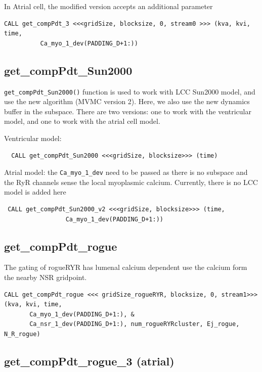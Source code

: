 In Atrial cell, the modified version accepts an additional parameter
\begin{verbatim}
CALL get_compPdt_3 <<<gridSize, blocksize, 0, stream0 >>> (kva, kvi, time,
          Ca_myo_1_dev(PADDING_D+1:)) 
\end{verbatim}

\subsection{get\_compPdt\_Sun2000}
\label{sec:get_compPdt_Sun2000}

\verb!get_compPdt_Sun2000()! function is used to work with LCC Sun2000 model,
and use the new algorithm (MVMC version 2). Here, we also use the new dynamics
buffer in the subspace. There are two versions: one to work with the ventricular
model, and one to work with the atrial cell model.

Ventricular model:
\begin{verbatim}
  CALL get_compPdt_Sun2000 <<<gridSize, blocksize>>> (time) 
\end{verbatim}

Atrial model: the \verb!Ca_myo_1_dev! need to be passed as there is no subspace
and the RyR channels sense the local myoplasmic calcium. Currently, there is no
LCC model is added here
\begin{verbatim}
 CALL get_compPdt_Sun2000_v2 <<<gridSize, blocksize>>> (time,
                 Ca_myo_1_dev(PADDING_D+1:))  
\end{verbatim}


\subsection{get\_compPdt\_rogue}
\label{sec:get_compPdt_rogue}

The gating of rogueRYR has lumenal calcium dependent use the calcium form the
nearby NSR gridpoint.

\begin{verbatim}
CALL get_compPdt_rogue <<< gridSize_rogueRYR, blocksize, 0, stream1>>> (kva, kvi, time, 
       Ca_myo_1_dev(PADDING_D+1:), &                                                                                                
       Ca_nsr_1_dev(PADDING_D+1:), num_rogueRYRcluster, Ej_rogue, N_R_rogue)
\end{verbatim}

\subsection{get\_compPdt\_rogue\_3 (atrial)}
\label{sec:get_compPdt_rogue}

